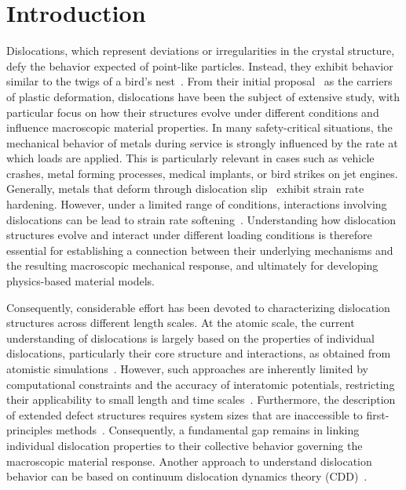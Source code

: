 \documentclass[pdflatex,sn-mathphys-num]{sn-jnl}%
\theoremstyle{thmstyleone}%
\theoremstyle{thmstyletwo}%
\theoremstyle{thmstylethree}%
\begin{document}
\section{Introduction}\label{sec1}

Dislocations, which represent deviations or irregularities in the crystal structure, defy the behavior expected of point-like particles. Instead, they exhibit behavior similar to the twigs of a bird’s nest~\cite{cottrell1954dislocations}.
From their initial proposal~\cite{Taylor} as the carriers of plastic deformation, dislocations have been the subject of extensive study, with particular focus on how their structures evolve under different conditions and influence macroscopic material properties.
In many safety-critical situations, the mechanical behavior of metals during service is strongly influenced by the rate at which loads are applied.
This is particularly relevant in cases such as vehicle crashes, metal forming processes, medical implants, or bird strikes on jet engines. Generally, metals that deform through dislocation slip~\cite{LINDHOLM1964317} exhibit strain rate hardening.
However, under a limited range of conditions, interactions involving dislocations can be lead to strain rate softening~\cite{ZAISER1997, Zaiser1999}. Understanding how dislocation structures evolve and interact under different loading conditions is therefore essential for establishing a connection between their underlying mechanisms and the resulting macroscopic mechanical response, and ultimately for developing physics-based material models.

Consequently, considerable effort has been devoted to characterizing dislocation structures across different length scales. At the atomic scale, the current understanding of dislocations is largely based on the properties of individual dislocations, particularly their core structure and interactions, as obtained from atomistic simulations~\cite{Vaild, ZepedaRuiz2021Atomistic}.
However, such approaches are inherently limited by computational constraints and the accuracy of interatomic potentials, restricting their applicability to small length and time scales~\cite{Deng, ZepedaRuiz2017Probing}.
Furthermore, the description of extended defect structures requires system sizes that are inaccessible to first-principles methods~\cite{Aleksei}.
Consequently, a fundamental gap remains in linking individual dislocation properties to their collective behavior governing the macroscopic material response.
Another approach to understand dislocation behavior can be based on continuum dislocation dynamics theory (CDD)~\cite{HOCHRAINER2014167, LIN2021102943}.
\end{document}
